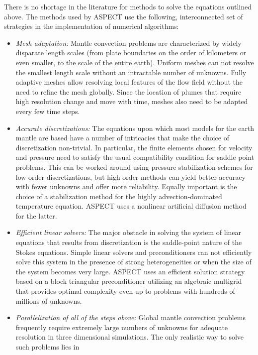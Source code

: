 \documentclass{article}
\newcommand{\aspect}{\textsc{ASPECT}}
\begin{document}
There is no shortage in the literature for methods to solve the equations
outlined above. The methods used by \aspect{} use the following,
interconnected set of strategies in the implementation of numerical
algorithms:
\begin{itemize}
\item \textit{Mesh adaptation:} Mantle convection problems are characterized
  by widely disparate length scales (from plate boundaries on the order of
  kilometers or even smaller, to the scale of the entire earth). Uniform
  meshes can not resolve the smallest length scale without an intractable
  number of unknowns.  Fully adaptive meshes allow resolving local features of
  the flow field without the need to refine the mesh globally. Since the
  location of plumes that require high resolution change and move with time,
  meshes also need to be adapted every few time steps.
\item \textit{Accurate discretizations:} The equations upon which
  most models for the earth mantle are based
  have a number of intricacies that make the choice of discretization
  non-trivial. In particular, the finite elements chosen for velocity and
  pressure need to satisfy the usual compatibility condition for saddle point
  problems. This can be worked around using pressure stabilization schemes for
  low-order discretizations, but high-order methods can yield better accuracy
  with fewer unknowns and offer more reliability. Equally important is the choice of
  a stabilization method for the highly advection-dominated temperature
  equation. \aspect{} uses a nonlinear artificial diffusion method for the latter.
\item \textit{Efficient linear solvers:} The major obstacle in solving the
  system of linear equations that results from discretization is the
  saddle-point nature of the Stokes equations.
  Simple linear solvers and preconditioners can not efficiently solve this system in
  the presence of strong heterogeneities or when the size of the system
  becomes very large. \aspect{} uses an efficient solution strategy based on a
  block triangular preconditioner utilizing an algebraic multigrid that
  provides optimal complexity even up to problems with hundreds of millions of
  unknowns.
\item \textit{Parallelization of all of the steps above:} Global mantle convection
  problems frequently require extremely large numbers of unknowns for
  adequate resolution in three dimensional simulations. The only realistic way to solve such problems lies in

\end{itemize}
\end{document}
